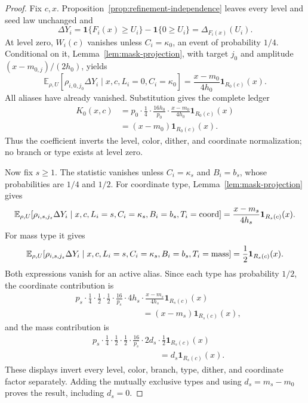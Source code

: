 \begin{proof}
Fix $c,x$.  Proposition~\ref{prop:refinement-independence} leaves every
level and seed law unchanged and
\[
 \Delta Y_i
 =\mathbf1\{F_i(x)\geq U_i\}-\mathbf1\{0\geq U_i\}
 =\Delta_{F_i(x)}(U_i).
\]
At level zero, $W_i(c)$ vanishes unless $C_i=\kappa_0$, an event of
probability $1/4$.  Conditional on it, Lemma~\ref{lem:mask-projection}, with
target $j_0$ and amplitude $(x-m_{0,j})/(2h_0)$, yields
\[
 \mathbb E_{\rho,U}[\rho_{i,0,j_0}\Delta Y_i
 \mid x,c,L_i=0,C_i=\kappa_0]
 =\frac{x-m_0}{4h_0}\mathbf1_{R_0(c)}(x).
\]
All aliases have already vanished.  Substitution gives the complete ledger
\[
\begin{aligned}
 K_0(x,c)
 &=p_0\cdot\frac14\cdot\frac{16h_0}{p_0}
   \cdot\frac{x-m_0}{4h_0}\mathbf1_{R_0(c)}(x)\\
 &=(x-m_0)\mathbf1_{R_0(c)}(x).
\end{aligned}
\]
Thus the coefficient inverts the level, color, dither, and coordinate
normalization; no branch or type exists at level zero.

Now fix $s\geq1$.  The statistic vanishes unless
$C_i=\kappa_s$ and $B_i=b_s$, whose probabilities are $1/4$ and $1/2$.
For coordinate type, Lemma~\ref{lem:mask-projection} gives
\[
 \mathbb E_{\rho,U}[\rho_{i,s,j_s}\Delta Y_i
 \mid x,c,L_i=s,C_i=\kappa_s,B_i=b_s,T_i={\rm coord}]
 =\frac{x-m_s}{4h_s}\mathbf1_{R_s(c)}(x).
\]
For mass type it gives
\[
 \mathbb E_{\rho,U}[\rho_{i,s,j_s}\Delta Y_i
 \mid x,c,L_i=s,C_i=\kappa_s,B_i=b_s,T_i={\rm mass}]
 =\frac12\mathbf1_{R_s(c)}(x).
\]
Both expressions vanish for an active alias.  Since each type has probability
$1/2$, the coordinate contribution is
\[
\begin{aligned}
 &p_s\cdot\frac14\cdot\frac12\cdot\frac12
 \cdot\frac{16}{p_s}\cdot4h_s
 \cdot\frac{x-m_s}{4h_s}\mathbf1_{R_s(c)}(x)\\
 &\hspace{8em}=(x-m_s)\mathbf1_{R_s(c)}(x),
\end{aligned}
\]
and the mass contribution is
\[
\begin{aligned}
 &p_s\cdot\frac14\cdot\frac12\cdot\frac12
 \cdot\frac{16}{p_s}\cdot2d_s
 \cdot\frac12\mathbf1_{R_s(c)}(x)\\
 &\hspace{8em}=d_s\mathbf1_{R_s(c)}(x).
\end{aligned}
\]
These displays invert every level, color, branch, type, dither, and coordinate
factor separately.  Adding the mutually exclusive types and using
$d_s=m_s-m_0$ proves the result, including $d_s=0$.
\end{proof}

